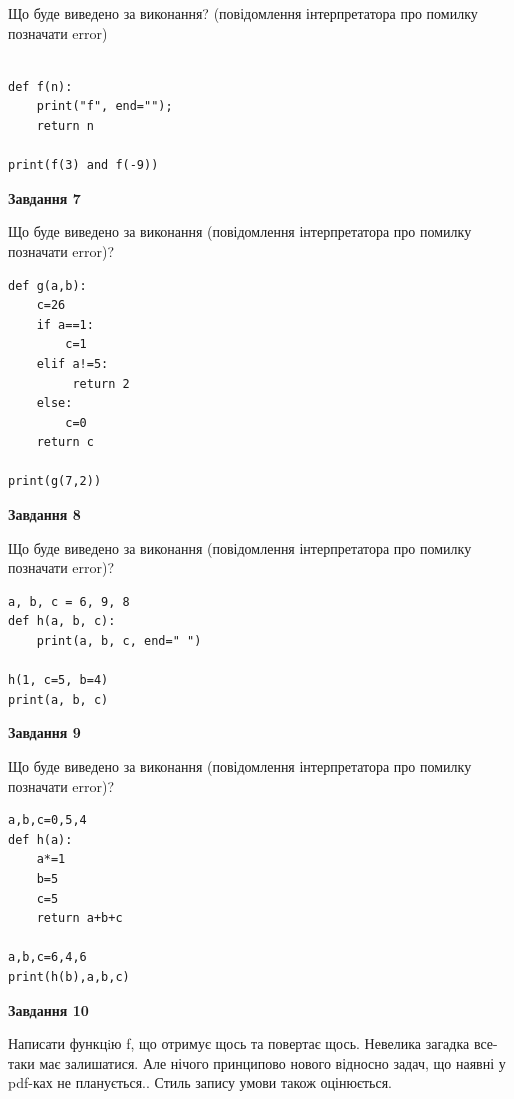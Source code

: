 \documentclass[12pt, ukrainian]{article}
\begin{document}
{\begin {large}
Що буде виведено за виконання? (повідомлення інтерпретатора про помилку позначати error)\par
\begin{verbatim}

def f(n):
    print("f", end="");
    return n

print(f(3) and f(-9))
\end{verbatim}

{\begin {center}\textbf{Завдання 7}\end {center}}

Що буде виведено за виконання (повідомлення інтерпретатора про помилку позначати error)?\par
\begin{verbatim}
def g(a,b):
    c=26
    if a==1:
        c=1
    elif a!=5:
         return 2
    else: 
        c=0
    return c

print(g(7,2))
\end{verbatim}

{\begin {center}\textbf{Завдання 8}\end {center}}

Що буде виведено за виконання (повідомлення інтерпретатора про помилку позначати error)?\par
\begin{verbatim}
a, b, c = 6, 9, 8
def h(a, b, c):
    print(a, b, c, end=" ")

h(1, c=5, b=4)
print(a, b, c)
\end{verbatim}

{\begin {center}\textbf{Завдання 9}\end {center}}

Що буде виведено за виконання (повідомлення інтерпретатора про помилку позначати error)?\par
\begin{verbatim}
a,b,c=0,5,4
def h(a):
    a*=1
    b=5
    c=5
    return a+b+c

a,b,c=6,4,6
print(h(b),a,b,c)
\end{verbatim}

{\begin {center}\textbf{Завдання 10}\end {center}}


Написати функцiю f, що отримує щось та повертає щось. Невелика загадка все-таки має залишатися. Але нічого принципово нового відносно задач, що наявні у pdf-ках не планується.. Стиль запису умови також оцінюється.\par
\end {large}}
\newpage
\end{document}
